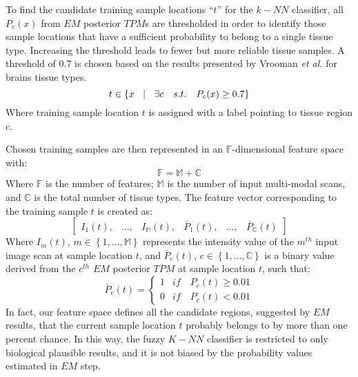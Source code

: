 To find the candidate training sample locations ``$t$'' for the $k-NN$ classifier, all $P_c(x)$ from $EM$ posterior $TPM$s are thresholded in order to identify those sample locations that have a sufficient probability to belong to a single tissue type. Increasing the threshold leads to fewer but more reliable tissue samples. A threshold of $0.7$ is chosen based on the results presented by Vrooman \emph{et al.}\cite{Vrooman2007} for brains tissue types.
\begin{equation}
t\in \left\{ x\quad \vline \quad \exists c \quad s.t. \quad P_c(x)\geq 0.7\right\}
\end{equation}
Where training sample location $t$ is assigned with a label pointing to tissue region $c$.

Chosen training samples are then represented in an $\mathbb{F}$-dimensional feature space with:
\begin{equation}
\mathbb{F}=\mathbb{M}+\mathbb{C}
\end{equation}
Where $\mathbb{F}$ is the number of features; $\mathbb{M}$ is the number of input multi-modal scans, and $\mathbb{C}$ is the total number of tissue types.
The feature vector corresponding to the training sample $t$ is created as:
\begin{equation} \label{eq:fvec}
\begin{bmatrix}
I_{1}(t), & ..., & I_{\mathbb{M}}(t), & \breve{P_1}(t), & ..., & \breve{P_{\mathbb{C}}}(t)
\end{bmatrix}
\end{equation}
Where $I_{m}(t)$, $m\in \left\{1,\ldots, \mathbb{M}\right\}$ represents the intensity value of the $m^{th}$ input image scan at sample location $t$, and $\breve{P_c}(t)$, $c\in \left\{1,\ldots, \mathbb{C}\right\}$ is a binary value derived from the $c^{th}$ $EM$ posterior $TPM$ at sample location $t$, such that:
\begin{equation}
\breve{P_c}(t) = \left\{\begin{matrix}
1 & if \quad P_c(t) \geq 0.01 \\ 
0 & if \quad P_c(t) <  0.01
\end{matrix}\right.
\end{equation}
In fact, our feature space defines all the candidate regions, suggested by $EM$ results, that the current sample location $t$ probably belongs to by more than one percent chance. In this way, the fuzzy $K-NN$ classifier is restricted to only biological plausible results, and it is not biased by the probability values estimated in $EM$ step.


